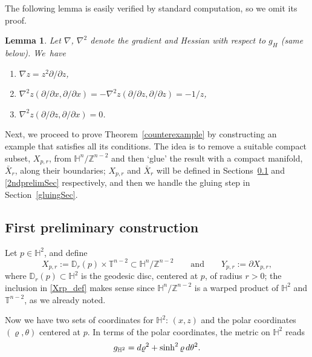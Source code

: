 \documentclass[11pt]{article}
\numberwithin{equation}{section}
\numberwithin{equation}{section}
\newtheorem{Lemma}[Theorem]{Lemma}
\def\H{\mathbb{H}}
\def\T{\mathbb{T}}
\def\Z{\mathbb{Z}}
\def\D{\mathbb{D}}
\def\ed{{\rm d}}
\begin{document}
The following lemma is easily verified by standard computation, so we omit its proof.
\begin{Lemma}\label{H2DerHess}
Let $\nabla$, $\nabla^2$ denote the gradient and Hessian
with respect to $g_H$ (same below). We~have
\begin{enumerate}\itemsep=0pt
    \item[$(a)$] $\nabla z=z^2{\partial}/{\partial z}$,
	\item[$(b)$] $\nabla^2z({\partial}/{\partial x}, {\partial}/{\partial x}) = -\nabla^2z({\partial}/{\partial z}, {\partial}/{\partial z})=-1/z$,
    \item[$(c)$] $\nabla^2z({\partial}/{\partial z}, {\partial}/{\partial x})=0$.
\end{enumerate}	
\end{Lemma}

Next, we proceed to prove
Theorem~\ref{counterexample} by constructing an example
that satisfies all its conditions. The idea is to remove a suitable compact
subset, $X_{p,r}$, from $\H^n/\Z^{n-2}$ and then `glue' the result with a
compact manifold, $\bar X_r$, along their boundaries; $X_{p,r}$ and
$\bar X_r$ will be defined in Sections~\ref{1stprelimSec} and \ref{2ndprelimSec}
respectively, and then we handle the gluing step
in Section~\ref{gluingSec}.






\subsection{First preliminary construction}\label{1stprelimSec}
Let $p\in \H^2$, and define
\begin{equation}\label{Xrp_def}
	X_{p,r}:= \D_r(p)\times \T^{n-2}\subset \H^{n}/\Z^{n-2} \qquad
	\mbox{and} \qquad  Y_{p,r} :=\partial X_{p,r},
\end{equation}
where $\D_r(p)\subset \H^2$ is the geodesic disc, centered at $p$, of radius $r>0$;
the inclusion in \eqref{Xrp_def} makes sense since $\H^n/\Z^{n-2}$ is a warped product
of $\H^2$ and $\T^{n-2}$, as we already noted.

Now we have two sets of coordinates for $\H^2$: $(x,z)$ and the polar coordinates
$(\varrho,\theta)$ centered at $p$. In terms of the polar coordinates, the metric on $\H^2$ reads
\begin{equation*}%
	g_{\H^2} = \ed\varrho^2 + \sinh^2\varrho\,\ed\theta^2.
\end{equation*}
\end{document}
